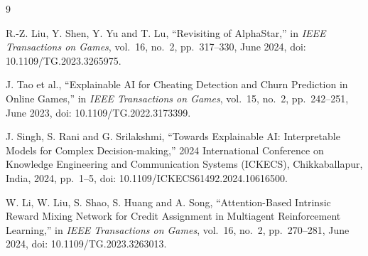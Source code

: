\documentclass[12pt,a4paper]{article}
\begin{document}
\begin{thebibliography}{9}
\setlength{\itemsep}{0.5em}

 R.-Z. Liu, Y. Shen, Y. Yu and T. Lu, ``Revisiting of AlphaStar,'' in \textit{IEEE Transactions on Games}, vol.~16, no.~2, pp.~317--330, June 2024, doi: 10.1109/TG.2023.3265975.

 J. Tao et al., ``Explainable AI for Cheating Detection and Churn Prediction in Online Games,'' in \textit{IEEE Transactions on Games}, vol.~15, no.~2, pp.~242--251, June 2023, doi: 10.1109/TG.2022.3173399.

 J. Singh, S. Rani and G. Srilakshmi, ``Towards Explainable AI: Interpretable Models for Complex Decision-making,'' 2024 International Conference on Knowledge Engineering and Communication Systems (ICKECS), Chikkaballapur, India, 2024, pp.~1--5, doi: 10.1109/ICKECS61492.2024.10616500.

 W. Li, W. Liu, S. Shao, S. Huang and A. Song, ``Attention-Based Intrinsic Reward Mixing Network for Credit Assignment in Multiagent Reinforcement Learning,'' in \textit{IEEE Transactions on Games}, vol.~16, no.~2, pp.~270--281, June 2024, doi: 10.1109/TG.2023.3263013.

\end{thebibliography}
\end{document}

